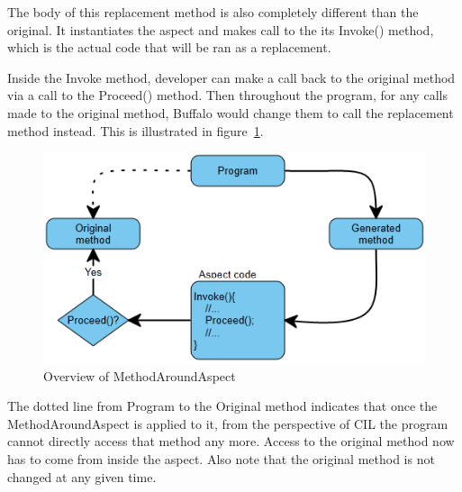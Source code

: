 The body of this replacement method is also completely different than the original. It instantiates the aspect and makes call to the its Invoke() method, which is the actual code that will be ran as a replacement. 

Inside the Invoke method, developer can make a call back to the original method via a call to the Proceed() method. Then throughout the program, for any calls made to the original method, Buffalo would change them to call the replacement method instead. This is illustrated in figure~\ref{around_overview}.

\begin{figure}[H]
  \includegraphics[scale=1.0]{AroundOverview.PNG}
  \centering
  \caption{Overview of MethodAroundAspect\label{around_overview}}
\end{figure}

The dotted line from Program to the Original method indicates that once the MethodAroundAspect is applied to it, from the perspective of CIL the program cannot directly access that method any more. Access to the original method now has to come from inside the aspect. Also note that the original method is not changed at any given time.
